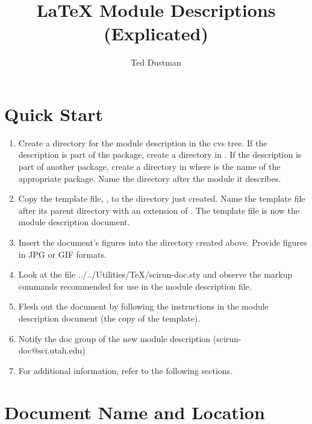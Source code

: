 \documentclass[11pt]{article}
\newcommand{\texutils}{../../Utilities/TeX}
\begin{document}
\begin{htmlonly}

\end{htmlonly}

\title{\LaTeX{} Module Descriptions (Explicated)}
\author{Ted Dustman}
\maketitle 
\newpage
\tableofcontents
\newpage


\section{Quick Start}

\begin{enumerate}
\item Create a directory for the module description in the cvs tree.  If the
  description is part of the \sr{} package, create a directory
  in .  If the description is part of another
  package, create a directory in
   where  is
  the name of the appropriate package.  Name the directory 
  after the module it describes.
\item Copy the template file,
  ,
  to the directory just created.  Name the template file after its parent
  directory with an extension of .  The template file is
  now the module description document.
\item Insert the document's figures into the directory created above.  Provide
  figures in JPG or GIF formats.
\item Look at the file 
  {\texutils{}/scirun-doc.sty} and observe the markup
  commands recommended for use in the module description file.
\item Flesh out the document by following the instructions in the
  module description document (the copy of the template).
\item Notify the doc group of the new module description
  (scirun-doc@sci.utah.edu)
\item For additional information, refer to the following sections.
\end{enumerate}


\section{Document Name and Location}
\end{document}
